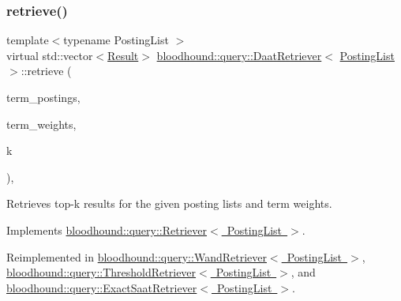 \subsubsection{\texorpdfstring{retrieve()}{retrieve()}}
{\footnotesize\ttfamily template$<$typename Posting\+List $>$ \\
virtual std\+::vector$<$\mbox{\hyperlink{structbloodhound_1_1query_1_1Result}{Result}}$>$ \mbox{\hyperlink{classbloodhound_1_1query_1_1DaatRetriever}{bloodhound\+::query\+::\+Daat\+Retriever}}$<$ \mbox{\hyperlink{classbloodhound_1_1PostingList}{Posting\+List}} $>$\+::retrieve (\begin{DoxyParamCaption}\item[{const std\+::vector$<$ \mbox{\hyperlink{classbloodhound_1_1PostingList}{Posting\+List}} $>$ \&}]{term\+\_\+postings,  }\item[{const std\+::vector$<$ \mbox{\hyperlink{structbloodhound_1_1Score}{Score}} $>$ \&}]{term\+\_\+weights,  }\item[{std\+::size\+\_\+t}]{k }\end{DoxyParamCaption})\hspace{0.3cm}{\ttfamily [inline]}, {\ttfamily [virtual]}}



Retrieves top-\/k results for the given posting lists and term weights. 



Implements \mbox{\hyperlink{classbloodhound_1_1query_1_1Retriever_ae3c6a4628c5580e620c213b3dcd47c2b}{bloodhound\+::query\+::\+Retriever$<$ Posting\+List $>$}}.



Reimplemented in \mbox{\hyperlink{classbloodhound_1_1query_1_1WandRetriever_a5f3068bc363c16c5b7255a925ea5af8c}{bloodhound\+::query\+::\+Wand\+Retriever$<$ Posting\+List $>$}}, \mbox{\hyperlink{classbloodhound_1_1query_1_1ThresholdRetriever_a06750450e1246e755ebad2d5dac6e8a8}{bloodhound\+::query\+::\+Threshold\+Retriever$<$ Posting\+List $>$}}, and \mbox{\hyperlink{classbloodhound_1_1query_1_1ExactSaatRetriever_aced2763cc2a4c12838fef4a20759049e}{bloodhound\+::query\+::\+Exact\+Saat\+Retriever$<$ Posting\+List $>$}}.

\mbox{\label{classbloodhound_1_1query_1_1DaatRetriever_a5b10288f90a4fc4d89f56971bdc48363}} 
